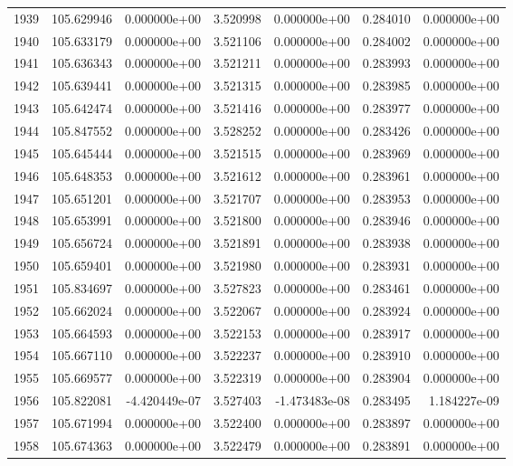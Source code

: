 \begin{tabular}{rrrrrrr}
1939 & 105.629946 &  0.000000e+00 &  3.520998 &  0.000000e+00 &    0.284010 &  0.000000e+00 \\
1940 & 105.633179 &  0.000000e+00 &  3.521106 &  0.000000e+00 &    0.284002 &  0.000000e+00 \\
1941 & 105.636343 &  0.000000e+00 &  3.521211 &  0.000000e+00 &    0.283993 &  0.000000e+00 \\
1942 & 105.639441 &  0.000000e+00 &  3.521315 &  0.000000e+00 &    0.283985 &  0.000000e+00 \\
1943 & 105.642474 &  0.000000e+00 &  3.521416 &  0.000000e+00 &    0.283977 &  0.000000e+00 \\
1944 & 105.847552 &  0.000000e+00 &  3.528252 &  0.000000e+00 &    0.283426 &  0.000000e+00 \\
1945 & 105.645444 &  0.000000e+00 &  3.521515 &  0.000000e+00 &    0.283969 &  0.000000e+00 \\
1946 & 105.648353 &  0.000000e+00 &  3.521612 &  0.000000e+00 &    0.283961 &  0.000000e+00 \\
1947 & 105.651201 &  0.000000e+00 &  3.521707 &  0.000000e+00 &    0.283953 &  0.000000e+00 \\
1948 & 105.653991 &  0.000000e+00 &  3.521800 &  0.000000e+00 &    0.283946 &  0.000000e+00 \\
1949 & 105.656724 &  0.000000e+00 &  3.521891 &  0.000000e+00 &    0.283938 &  0.000000e+00 \\
1950 & 105.659401 &  0.000000e+00 &  3.521980 &  0.000000e+00 &    0.283931 &  0.000000e+00 \\
1951 & 105.834697 &  0.000000e+00 &  3.527823 &  0.000000e+00 &    0.283461 &  0.000000e+00 \\
1952 & 105.662024 &  0.000000e+00 &  3.522067 &  0.000000e+00 &    0.283924 &  0.000000e+00 \\
1953 & 105.664593 &  0.000000e+00 &  3.522153 &  0.000000e+00 &    0.283917 &  0.000000e+00 \\
1954 & 105.667110 &  0.000000e+00 &  3.522237 &  0.000000e+00 &    0.283910 &  0.000000e+00 \\
1955 & 105.669577 &  0.000000e+00 &  3.522319 &  0.000000e+00 &    0.283904 &  0.000000e+00 \\
1956 & 105.822081 & -4.420449e-07 &  3.527403 & -1.473483e-08 &    0.283495 &  1.184227e-09 \\
1957 & 105.671994 &  0.000000e+00 &  3.522400 &  0.000000e+00 &    0.283897 &  0.000000e+00 \\
1958 & 105.674363 &  0.000000e+00 &  3.522479 &  0.000000e+00 &    0.283891 &  0.000000e+00 \\

\end{tabular}

